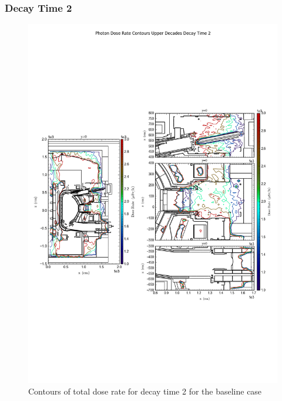 \documentclass[12pt]{article}
\begin{document}
\subsubsection*{Decay Time 2}
\begin{figure}[ht!]
\centering
\includegraphics[trim={0cm 8cm, 0cm 8cm},clip,scale=0.6]{../plots/final_model/Photon_Dose_Rate_Contours_Upper_Decades_Decay_Time_2.png}
\caption{Contours of total dose rate for decay time 2 for the baseline case}
\label{fig:photons_dc2_nob4c_contours}
\end{figure}
\end{document}
